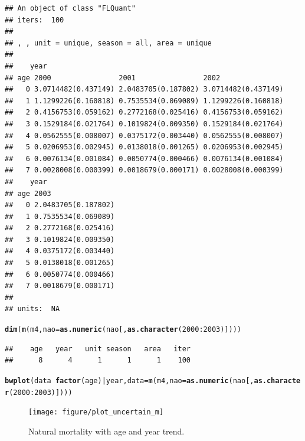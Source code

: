 \documentclass[a4paper,english,10pt]{article}\usepackage[]{graphicx}\usepackage[]{color}
\makeatletter
\newcommand{\hlnum}[1]{\textcolor[rgb]{0.686,0.059,0.569}{#1}}%
\newcommand{\hlopt}[1]{\textcolor[rgb]{0,0,0}{#1}}%
\newcommand{\hlstd}[1]{\textcolor[rgb]{0.345,0.345,0.345}{#1}}%
\newcommand{\hlkwc}[1]{\textcolor[rgb]{0.333,0.667,0.333}{#1}}%
\newcommand{\hlkwd}[1]{\textcolor[rgb]{0.737,0.353,0.396}{\textbf{#1}}}%
\newenvironment{kframe}{%
 \def\at@end@of@kframe{}%
 \ifinner\ifhmode%
  \def\at@end@of@kframe{\end{minipage}}%
  \begin{minipage}{\columnwidth}%
 \fi\fi%
 \def\FrameCommand##1{\hskip\@totalleftmargin \hskip-\fboxsep
 \colorbox{shadecolor}{##1}\hskip-\fboxsep
     \hskip-\linewidth \hskip-\@totalleftmargin \hskip\columnwidth}%
 \MakeFramed {\advance\hsize-\width
   \@totalleftmargin\z@ \linewidth\hsize
   \@setminipage}}%
 {\par\unskip\endMakeFramed%
 \at@end@of@kframe}
\newenvironment{knitrout}{}{} %
\makeatother
\begin{document}
\begin{knitrout}
\begin{kframe}
\begin{alltt}
\end{alltt}
\begin{verbatim}
## An object of class "FLQuant"
## iters:  100 
## 
## , , unit = unique, season = all, area = unique
## 
##    year
## age 2000                2001                2002               
##   0 3.0714482(0.437149) 2.0483705(0.187802) 3.0714482(0.437149)
##   1 1.1299226(0.160818) 0.7535534(0.069089) 1.1299226(0.160818)
##   2 0.4156753(0.059162) 0.2772168(0.025416) 0.4156753(0.059162)
##   3 0.1529184(0.021764) 0.1019824(0.009350) 0.1529184(0.021764)
##   4 0.0562555(0.008007) 0.0375172(0.003440) 0.0562555(0.008007)
##   5 0.0206953(0.002945) 0.0138018(0.001265) 0.0206953(0.002945)
##   6 0.0076134(0.001084) 0.0050774(0.000466) 0.0076134(0.001084)
##   7 0.0028008(0.000399) 0.0018679(0.000171) 0.0028008(0.000399)
##    year
## age 2003               
##   0 2.0483705(0.187802)
##   1 0.7535534(0.069089)
##   2 0.2772168(0.025416)
##   3 0.1019824(0.009350)
##   4 0.0375172(0.003440)
##   5 0.0138018(0.001265)
##   6 0.0050774(0.000466)
##   7 0.0018679(0.000171)
## 
## units:  NA
\end{verbatim}
\begin{alltt}
\hlkwd{dim}\hlstd{(}\hlkwd{m}\hlstd{(m4,} \hlkwc{nao} \hlstd{=} \hlkwd{as.numeric}\hlstd{(nao[,} \hlkwd{as.character}\hlstd{(}\hlnum{2000}\hlopt{:}\hlnum{2003}\hlstd{)])))}
\end{alltt}
\begin{verbatim}
##    age   year   unit season   area   iter 
##      8      4      1      1      1    100
\end{verbatim}
\end{kframe}
\end{knitrout}


\begin{knitrout}
\color{fgcolor}\begin{kframe}
\begin{alltt}
\hlkwd{bwplot}\hlstd{(data} \hlopt{~} \hlkwd{factor}\hlstd{(age)} \hlopt{|} \hlstd{year,} \hlkwc{data} \hlstd{=} \hlkwd{m}\hlstd{(m4,} \hlkwc{nao} \hlstd{=} \hlkwd{as.numeric}\hlstd{(nao[,} \hlkwd{as.character}\hlstd{(}\hlnum{2000}\hlopt{:}\hlnum{2003}\hlstd{)])))}
\end{alltt}
\end{kframe}
\end{knitrout}


\begin{figure}[h]
\begin{knitrout}
\color{fgcolor}

{\centering \texttt{[image: figure/plot\_uncertain\_m]} 

}



\end{knitrout}

\caption{Natural mortality with age and year trend.}
\label{fig:uncertain_m}
\end{figure}
\end{document}
